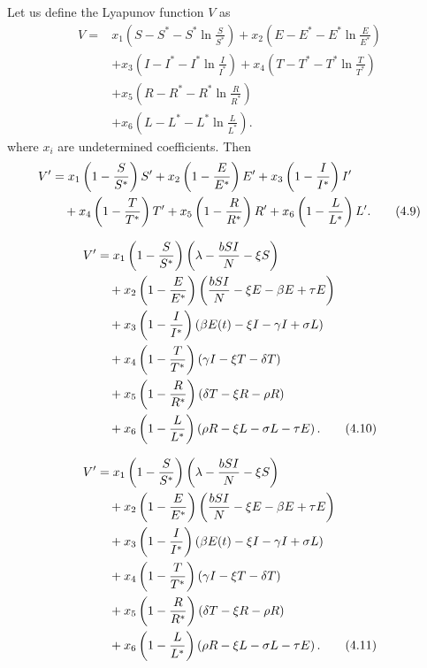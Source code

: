 \documentclass[10pt]{NSP1}
\begin{document}
	Let us define the Lyapunov function $V$ as
	\begin{equation}
		\begin{aligned}
			V ={}& x_1 \left( S - S^\ast - S^\ast \ln \frac{S}{S^\ast} \right)
			+ x_2 \left( E - E^\ast - E^\ast \ln \frac{E}{E^\ast} \right) \\
			& + x_3 \left( I - I^\ast - I^\ast \ln \frac{I}{I^\ast} \right)
			+ x_4 \left( T - T^\ast - T^\ast \ln \frac{T}{T^\ast} \right) \\
			& + x_5 \left( R - R^\ast - R^\ast \ln \frac{R}{R^\ast} \right) \\
			& + x_6 \left( L - L^\ast - L^\ast \ln \frac{L}{L^\ast} \right).
		\end{aligned}
		\tag{4.8}
	\end{equation}
	where $x_i$ are undetermined coefficients. Then
	\begin{align}
		V' &= x_1 \left(1 - \frac{S}{S^*}\right) S' + x_2 \left(1 - \frac{E}{E^*}\right) E' + x_3 \left(1 - \frac{I}{I^*}\right) I' \notag \\
		&\quad + x_4 \left(1 - \frac{T}{T^*}\right) T' + x_5 \left(1 - \frac{R}{R^*}\right) R' + x_6 \left(1 - \frac{L}{L^*}\right) L'.
		\tag{4.9}
	\end{align}
	
	\begin{align}
		V' &= x_1 \left(1 - \frac{S}{S^*}\right) \left( \lambda - \frac{b S I}{N} - \xi S \right) \notag \\
		&\quad + x_2 \left(1 - \frac{E}{E^*}\right) \left( \frac{b S I}{N} - \xi E - \beta E + \tau E \right) \notag \\
		&\quad + x_3 \left(1 - \frac{I}{I^*}\right) \left( \beta E(t) - \xi I - \gamma I + \sigma L \right) \notag \\
		&\quad + x_4 \left(1 - \frac{T}{T^*}\right) \left( \gamma I - \xi T - \delta T \right) \notag \\
		&\quad + x_5 \left(1 - \frac{R}{R^*}\right) \left( \delta T - \xi R - \rho R \right) \notag \\
		&\quad + x_6 \left(1 - \frac{L}{L^*}\right) \left( \rho R - \xi L - \sigma L - \tau E \right).
		\tag{4.10}
	\end{align}
	
	\begin{align}
		V' &= x_1 \left(1 - \frac{S}{S^*}\right) \left( \lambda - \frac{b S I}{N} - \xi S \right) \notag \\
		&\quad + x_2 \left(1 - \frac{E}{E^*}\right) \left( \frac{b S I}{N} - \xi E - \beta E + \tau E \right) \notag \\
		&\quad + x_3 \left(1 - \frac{I}{I^*}\right) \left( \beta E(t) - \xi I - \gamma I + \sigma L \right) \notag \\
		&\quad + x_4 \left(1 - \frac{T}{T^*}\right) \left( \gamma I - \xi T - \delta T \right) \notag \\
		&\quad + x_5 \left(1 - \frac{R}{R^*}\right) \left( \delta T - \xi R - \rho R \right) \notag \\
		&\quad + x_6 \left(1 - \frac{L}{L^*}\right) \left( \rho R - \xi L - \sigma L - \tau E \right).
		\tag{4.11}
	\end{align}
	
\end{document}
